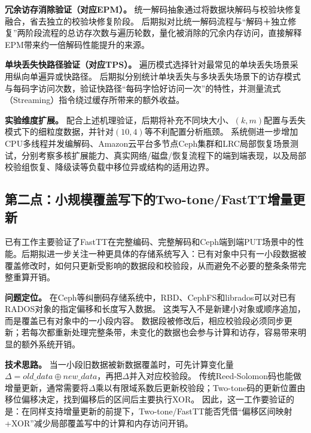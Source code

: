 \textbf{冗余访存消除验证（对应EPM）。}
统一解码抽象通过将数据块解码与校验块修复融合，省去独立的校验块修复阶段。
后期拟对比统一解码流程与“解码＋独立修复”两阶段流程的总访存次数与遍历轮数，量化被消除的冗余内存访问，直接解释EPM带来约一倍解码性能提升的来源。

\textbf{单块丢失快路径验证（对应TPS）。}
遍历模式选择针对最常见的单块丢失场景采用纵向单遍异或快路径。
后期拟分别统计单块丢失与多块丢失场景下的访存模式与每码字访问次数，验证快路径“每码字恰好访问一次”的特性，并测量流式（Streaming）指令绕过缓存所带来的额外收益。

\textbf{实验维度扩展。}
配合上述机理验证，后期将补充不同块大小、$(k,m)$配置与丢失模式下的细粒度数据，并针对$(10,4)$等不利配置分析瓶颈。
系统侧进一步增加CPU多线程并发编解码、Amazon云平台多节点Ceph集群和LRC局部恢复场景测试，分别考察多核扩展能力、真实网络/磁盘/恢复流程下的端到端表现，以及局部校验组恢复、降级读等负载中移位异或结构的适用边界。

\subsection{第二点：小规模覆盖写下的Two-tone/FastTT增量更新}

已有工作主要验证了FastTT在完整编码、完整解码和Ceph端到端PUT场景中的性能。后期拟进一步关注一种更具体的存储系统写入：已有对象中只有一小段数据被覆盖修改时，如何只更新受影响的数据段和校验段，从而避免不必要的整条条带完整重算开销。

\textbf{问题定位。}
在Ceph等纠删码存储系统中，RBD、CephFS和librados可以对已有RADOS对象的指定偏移和长度写入数据。
这类写入不是新建小对象或顺序追加，而是覆盖已有对象中的一小段内容。
数据段被修改后，相应校验段必须同步更新；若每次都重新处理完整条带，未变化的数据也会参与计算和访存，容易带来明显的额外系统开销。

\textbf{技术思路。}
当一小段旧数据被新数据覆盖时，可先计算变化量$\Delta=old\_data\oplus new\_data$，再把$\Delta$并入对应校验段。
传统Reed-Solomon码也能做增量更新，通常需要将$\Delta$乘以有限域系数后更新校验段；Two-tone码的更新位置由移位偏移决定，找到偏移后的区间后主要执行XOR。
因此，这一工作要验证的是：在同样支持增量更新的前提下，Two-tone/FastTT能否凭借“偏移区间映射+XOR”减少局部覆盖写中的计算和内存访问开销。


